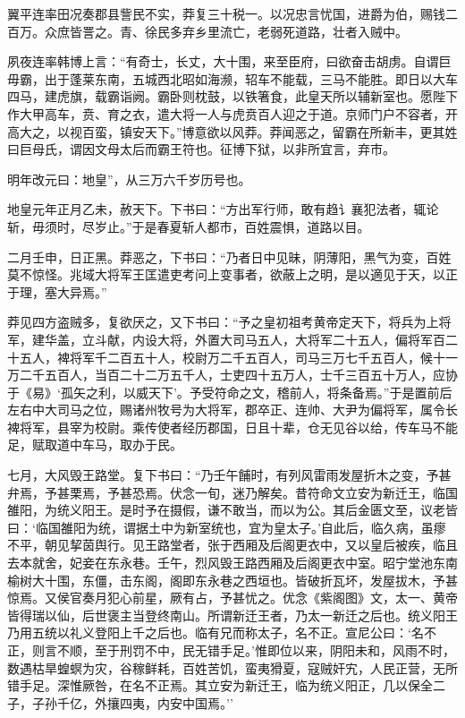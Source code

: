 \documentclass[]{article}
\begin{document}
翼平连率田况奏郡县訾民不实，莽复三十税一。以况忠言忧国，进爵为伯，赐钱二百万。众庶皆詈之。青、徐民多弃乡里流亡，老弱死道路，壮者入贼中。

夙夜连率韩博上言：``有奇士，长丈，大十围，来至臣府，曰欲奋击胡虏。自谓巨毋霸，出于蓬莱东南，五城西北昭如海濒，轺车不能载，三马不能胜。即日以大车四马，建虎旗，载霸诣阙。霸卧则枕鼓，以铁箸食，此皇天所以辅新室也。愿陛下作大甲高车，贲、育之衣，遣大将一人与虎贲百人迎之于道。京师门户不容者，开高大之，以视百蛮，镇安天下。''博意欲以风莽。莽闻恶之，留霸在所新丰，更其姓曰巨母氏，谓因文母太后而霸王符也。征博下狱，以非所宜言，弃市。

明年改元曰：地皇''，从三万六千岁历号也。

地皇元年正月乙未，赦天下。下书曰：``方出军行师，敢有趋讠襄犯法者，辄论斩，毋须时，尽岁止。''于是春夏斩人都市，百姓震惧，道路以目。

二月壬申，日正黑。莽恶之，下书曰：``乃者日中见昧，阴薄阳，黑气为变，百姓莫不惊怪。兆域大将军王匡遣吏考问上变事者，欲蔽上之明，是以適见于天，以正于理，塞大异焉。''

莽见四方盗贼多，复欲厌之，又下书曰：``予之皇初祖考黄帝定天下，将兵为上将军，建华盖，立斗献，内设大将，外置大司马五人，大将军二十五人，偏将军百二十五人，裨将军千二百五十人，校尉万二千五百人，司马三万七千五百人，候十一万二千五百人，当百二十二万五千人，士吏四十五万人，士千三百五十万人，应协于《易》`孤矢之利，以威天下'。予受符命之文，稽前人，将条备焉。''于是置前后左右中大司马之位，赐诸州牧号为大将军，郡卒正、连帅、大尹为偏将军，属令长裨将军，县宰为校尉。乘传使者经历郡国，日且十辈，仓无见谷以给，传车马不能足，赋取道中车马，取办于民。

七月，大风毁王路堂。复下书曰：``乃壬午餔时，有列风雷雨发屋折木之变，予甚弁焉，予甚栗焉，予甚恐焉。伏念一旬，迷乃解矣。昔符命文立安为新迁王，临国雒阳，为统义阳王。是时予在摄假，谦不敢当，而以为公。其后金匮文至，议老皆曰：`临国雒阳为统，谓据土中为新室统也，宜为皇太子。'自此后，临久病，虽瘳不平，朝见挈茵舆行。见王路堂者，张于西厢及后阁更衣中，又以皇后被疾，临且去本就舍，妃妾在东永巷。壬午，烈风毁王路西厢及后阁更衣中室。昭宁堂池东南榆树大十围，东僵，击东阁，阁即东永巷之西垣也。皆破折瓦坏，发屋拔木，予甚惊焉。又侯官奏月犯心前星，厥有占，予甚忧之。优念《紫阁图》文，太一、黄帝皆得瑞以仙，后世褒主当登终南山。所谓新迁王者，乃太一新迁之后也。统义阳王乃用五统以礼义登阳上千之后也。临有兄而称太子，名不正。宣尼公曰：`名不正，则言不顺，至于刑罚不中，民无错手足。'惟即位以来，阴阳未和，风雨不时，数遇枯旱蝗螟为灾，谷稼鲜耗，百姓苦饥，蛮夷猾夏，寇贼奸宄，人民正营，无所错手足。深惟厥咎，在名不正焉。其立安为新迁王，临为统义阳正，几以保全二子，子孙千亿，外攘四夷，内安中国焉。''
\end{document}
